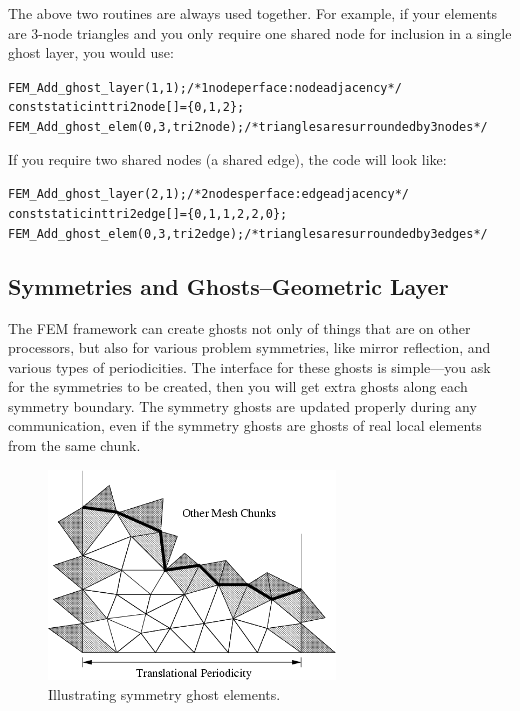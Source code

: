 The above two routines are always used together. For example, if your elements are 3-node triangles and you only require one shared node for inclusion in a single ghost layer, you would use:
\begin{alltt}
   FEM\_Add\_ghost\_layer(1,1); /* 1 node per face: node adjacency */
   const static int tri2node[]=\{0,1,2\};
   FEM\_Add\_ghost\_elem(0,3,tri2node); /* triangles are surrounded by 3 nodes */
\end{alltt}

If you require two shared nodes (a shared edge), the code will look like:
\begin{alltt}    
   FEM\_Add\_ghost\_layer(2,1); /* 2 nodes per face: edge adjacency */
   const static int tri2edge[]=\{0,1,  1,2,  2,0\};
   FEM\_Add\_ghost\_elem(0,3,tri2edge); /*triangles are surrounded by 3 edges */
\end{alltt}


\subsection{Symmetries and Ghosts--Geometric Layer}

The FEM framework can create ghosts not only of things that are on other 
processors, but also for various problem symmetries, like mirror reflection,
and various types of periodicities.  The interface for these ghosts is 
simple---you ask for the symmetries to be created, then you will get 
extra ghosts along each symmetry boundary.  The symmetry ghosts are
updated properly during any communication, even if the symmetry ghosts
are ghosts of real local elements from the same chunk.


\begin{figure}[h]
\begin{center}
\includegraphics[width=3in]{fig/sym_ghost}
\end{center}
\caption{Illustrating symmetry ghost elements.}
\label{fig:symghost}
\end{figure}

